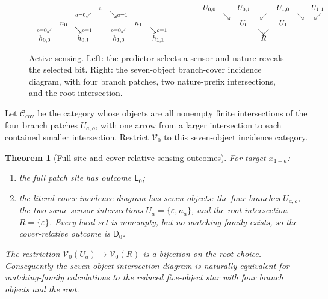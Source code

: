 \documentclass[11pt]{article}
\theoremstyle{plain}
\newtheorem{theorem}{Theorem}[section]
\theoremstyle{definition}
\theoremstyle{remark}
\begin{document}
\begin{figure}[htbp]
\centering
\[
\begin{array}{c@{\qquad\qquad}c}
\begin{array}{ccccccc}
&&&\varepsilon&&&\\[-1mm]
&&\scriptstyle a=0\swarrow&&\searrow\scriptstyle a=1&&\\
&n_0&&&&n_1&\\[-1mm]
\scriptstyle o=0\swarrow&&\searrow\scriptstyle o=1&&
\scriptstyle o=0\swarrow&&\searrow\scriptstyle o=1\\
h_{0,0}&&h_{0,1}&&h_{1,0}&&h_{1,1}
\end{array}
&
\begin{array}{ccccccc}
U_{0,0}&&U_{0,1}&&U_{1,0}&&U_{1,1}\\
&\searrow&&\swarrow& &\searrow&\swarrow\\[-1mm]
&&U_0&&U_1&&\\
&&&\searrow\!\!\swarrow&&&\\[-1mm]
&&&R&&&
\end{array}
\end{array}
\]
\caption{Active sensing. Left: the predictor selects a sensor and nature reveals
the selected bit. Right: the seven-object branch-cover incidence diagram, with
four branch patches, two nature-prefix intersections, and the root intersection.}
\label{fig:sensing}
\end{figure}

Let $\mathcal C_{\mathrm{cov}}$ be the category whose objects are all nonempty
finite intersections of the four branch patches $U_{a,o}$, with one arrow from a
larger intersection to each contained smaller intersection. Restrict
$\mathscr V_0$ to this seven-object incidence category.

\begin{theorem}[Full-site and cover-relative sensing outcomes]
\label{thm:sensing-negative}
For target $x_{1-a}$:
\begin{enumerate}[label=(\roman*)]
\item the full patch site has outcome $\mathsf L_0$;
\item the literal cover-incidence diagram has seven objects: the four branches
$U_{a,o}$, the two same-sensor intersections
$U_a=\{\varepsilon,n_a\}$, and the root intersection
$R=\{\varepsilon\}$. Every local set is nonempty, but no matching family exists,
so the cover-relative outcome is $\mathsf D_0$.
\end{enumerate}
The restriction $\mathscr V_0(U_a)\to\mathscr V_0(R)$ is a bijection on the
root choice. Consequently the seven-object intersection diagram is naturally
equivalent for matching-family calculations to the reduced five-object star
with four branch objects and the root.
\end{theorem}
\end{document}
